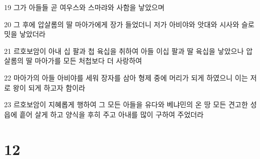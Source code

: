 \par 19 그가 아들들 곧 여우스와 스마랴와 사함을 낳았으며
\par 20 그 후에 압살롬의 딸 마아가에게 장가 들었더니 저가 아비야와 앗대와 시사와 슬로밋을 낳았더라
\par 21 르호보암이 아내 십 팔과 첩 육십을 취하여 아들 이십 팔과 딸 육십을 낳았으나 압살롬의 딸 마아가를 모든 처첩보다 더 사랑하여
\par 22 마아가의 아들 아비야를 세워 장자를 삼아 형제 중에 머리가 되게 하였으니 이는 저로 왕이 되게 하고자 함이라
\par 23 르호보암이 지혜롭게 행하여 그 모든 아들을 유다와 베냐민의 온 땅 모든 견고한 성읍에 흩어 살게 하고 양식을 후히 주고 아내를 많이 구하여 주었더라

\chapter{12}

